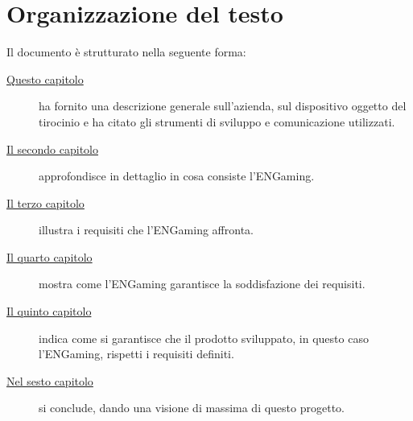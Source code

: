 \section{Organizzazione del testo}
Il documento è strutturato nella seguente forma:
\begin{description}
    \item[{\hyperref[cap:introduzione]{Questo capitolo}}] ha fornito una descrizione generale sull'azienda, sul dispositivo oggetto del tirocinio e ha citato gli strumenti di sviluppo e comunicazione utilizzati.
    
    \item[{\hyperref[cap:descrizione-stage]{Il secondo capitolo}}] approfondisce in dettaglio in cosa consiste l'ENGaming.
    
    \item[{\hyperref[cap:analisi-requisiti]{Il terzo capitolo}}] illustra i requisiti che l'ENGaming affronta.
    
    \item[{\hyperref[cap:progettazione-codifica]{Il quarto capitolo}}] mostra come l'ENGaming garantisce la soddisfazione dei requisiti.
    
    \item[{\hyperref[cap:verifica-validazione]{Il quinto capitolo}}] indica come si garantisce che il prodotto sviluppato, in questo caso l'ENGaming, rispetti i requisiti definiti.
    
    \item[{\hyperref[cap:conclusioni]{Nel sesto capitolo}}] si conclude, dando una visione di massima di questo progetto.
\end{description}

